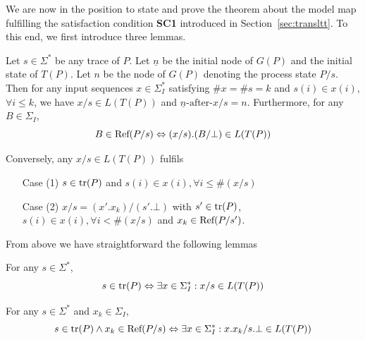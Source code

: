 We are now in the position to state and prove the theorem about the model map 
fulfilling the satisfaction condition {\bf SC1} introduced in Section~\ref{sec:transltt}. To this end, we first introduce three lemmas.



\begin{lemma}
Let $s\in \Sigma^*$ be any trace of $P$. Let $\underline n$ be the initial node of $G(P)$ and the initial state of $T(P)$. Let $n$ be the node of $G(P)$ denoting the process state $P/s$. Then for any input sequences $x\in \Sigma_I^*$ satisfying 
$\#x = \#s = k$   and $s(i)\in x(i)$, $\forall i\le k$, we have $x/s\in L(T(P))$ and $\underline n{\text{-after-}}x/s=n$. Furthermore,
for any $B\in \Sigma_I$, 
$$
B\in {\text{\rm Ref}}(P/s)\Leftrightarrow (x/s).(B/\bot) \in L(T(P))
$$

Conversely, any $x/s\in L(T(P))$ fulfils 
\begin{itemize}
\item[Case (1)] $s\in {\text {\rm tr}}(P)$ and $s(i)\in x(i), \forall i\le \#(x/s)$ \item[Case (2)] $x/s=(x'.x_k)/(s'.\bot)$ with $s'\in {\text {\rm tr}}(P)$, $s(i)\in x(i), \forall i< \#(x/s)$ and $x_k\in {\text{\rm Ref}}(P/s')$. 
\end{itemize}
\end{lemma}


From above we have straightforward the following lemmas
\begin{lemma}
For any $s\in \Sigma^*$, 
$$s\in {\text {\rm tr}}(P) \Leftrightarrow \exists x\in \Sigma_I^*: x/s \in L(T(P))$$
\end{lemma}

\begin{lemma}
For any $s\in \Sigma^*$ and $x_k\in \Sigma_I$, 
$$s\in {\text {\rm tr}}(P) \wedge  x_k\in {\text {\rm Ref}}(P/s)\Leftrightarrow \exists x\in \Sigma_I^*: x.x_k/s.\bot \in L(T(P))$$
\end{lemma}

